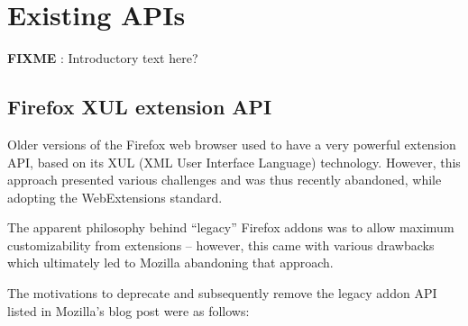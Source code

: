 \documentclass[a4paper,parskip=full]{scrreprt}
\newcommand{\fixme}[1]{\textbf{FIXME} \emph{#1}}
\begin{document}
\chapter{Existing APIs}
\label{unsuitable}

\fixme{}: Introductory text here?

\section{Firefox XUL extension API}

Older versions of the Firefox web browser used to have a very powerful extension
API, based on its XUL (XML User Interface Language) technology. However, this
approach presented various challenges and was thus recently abandoned, while
adopting the WebExtensions standard.

The apparent philosophy behind ``legacy'' Firefox addons was to allow maximum
customizability from extensions -- however, this came with various drawbacks
which ultimately led to Mozilla abandoning that approach.

The motivations to deprecate and subsequently remove the legacy addon API listed
in Mozilla's blog post \citep{mozilla-webext} were as follows:
\end{document}

